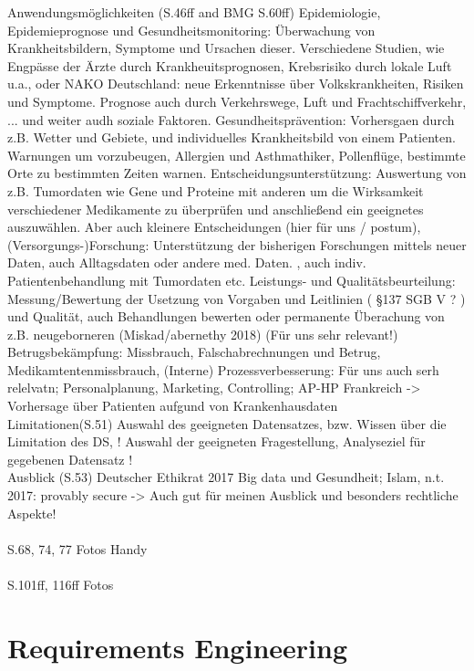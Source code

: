 Anwendungsmöglichkeiten (S.46ff and BMG S.60ff) Epidemiologie, Epidemieprognose und Gesundheitsmonitoring: Überwachung von Krankheitsbildern, Symptome und Ursachen dieser. Verschiedene Studien, wie Engpässe der Ärzte durch Krankheuitsprognosen, Krebsrisiko durch lokale Luft u.a., oder NAKO Deutschland: neue Erkenntnisse über Volkskrankheiten, Risiken und Symptome. Prognose auch durch Verkehrswege, Luft und Frachtschiffverkehr, ... und weiter audh soziale Faktoren.
Gesundheitsprävention: Vorhersgaen durch z.B. Wetter und Gebiete, und individuelles Krankheitsbild von einem Patienten. Warnungen um vorzubeugen, Allergien und Asthmathiker, Pollenflüge, bestimmte Orte zu bestimmten Zeiten warnen.
Entscheidungsunterstützung: Auswertung von z.B. Tumordaten wie Gene und Proteine mit anderen um die Wirksamkeit verschiedener Medikamente zu überprüfen und anschließend ein geeignetes auszuwählen. Aber auch kleinere Entscheidungen (hier für uns / postum),
(Versorgungs-)Forschung: Unterstützung der bisherigen Forschungen mittels neuer Daten, auch Alltagsdaten oder andere med. Daten. , auch indiv. Patientenbehandlung mit Tumordaten etc.
Leistungs- und Qualitätsbeurteilung: Messung/Bewertung  der Usetzung von Vorgaben und Leitlinien ( §137 SGB V ? ) und Qualität, auch Behandlungen bewerten oder permanente Überachung von z.B. neugeborneren (Miskad/abernethy 2018) (Für uns sehr relevant!)
Betrugsbekämpfung: Missbrauch, Falschabrechnungen und Betrug, Medikamtentenmissbrauch,
(Interne) Prozessverbesserung: Für uns auch serh relelvatn; Personalplanung, Marketing, Controlling; AP-HP Frankreich -> Vorhersage über Patienten aufgund von Krankenhausdaten
\\

Limitationen(S.51) Auswahl des geeigneten Datensatzes, bzw. Wissen über die Limitation des DS, ! Auswahl der geeigneten Fragestellung, Analyseziel für gegebenen Datensatz !\\

Ausblick (S.53)  Deutscher Ethikrat 2017 Big data und Gesundheit; Islam, n.t. 2017: provably secure -> Auch gut für meinen Ausblick und besonders rechtliche Aspekte!\\ \\


S.68, 74, 77 Fotos Handy\\ \\


S.101ff, 116ff Fotos


\section{Requirements Engineering}
